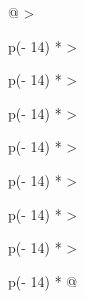 \begin{longtable}[]{@{}
  >{\raggedright\arraybackslash}p{(\columnwidth - 14\tabcolsep) * }
  >{\raggedright\arraybackslash}p{(\columnwidth - 14\tabcolsep) * }
  >{\raggedright\arraybackslash}p{(\columnwidth - 14\tabcolsep) * }
  >{\raggedright\arraybackslash}p{(\columnwidth - 14\tabcolsep) * }
  >{\raggedright\arraybackslash}p{(\columnwidth - 14\tabcolsep) * }
  >{\raggedright\arraybackslash}p{(\columnwidth - 14\tabcolsep) * }
  >{\raggedright\arraybackslash}p{(\columnwidth - 14\tabcolsep) * }
  >{\raggedright\arraybackslash}p{(\columnwidth - 14\tabcolsep) * }@{}}
\toprule\noalign{}
\end{longtable}
